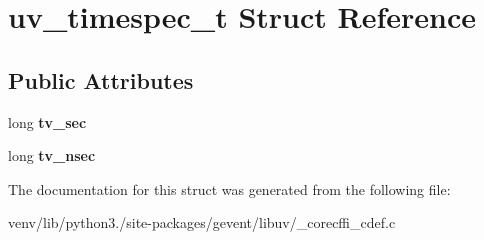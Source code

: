 \hypertarget{structuv__timespec__t}{}\section{uv\+\_\+timespec\+\_\+t Struct Reference}
\label{structuv__timespec__t}
\subsection*{Public Attributes}
\begin{DoxyCompactItemize}
\item 
\mbox{\label{structuv__timespec__t_a6c1e6a2cd2d9f10dc4df27ab3a79bc9d}} 
long {\bfseries tv\+\_\+sec}
\item 
\mbox{\label{structuv__timespec__t_af1552c618f27286c9734be801d0ecf3f}} 
long {\bfseries tv\+\_\+nsec}
\end{DoxyCompactItemize}


The documentation for this struct was generated from the following file\+:\begin{DoxyCompactItemize}
\item 
venv/lib/python3./site-\/packages/gevent/libuv/\+\_\+corecffi\+\_\+cdef.\+c\end{DoxyCompactItemize}
